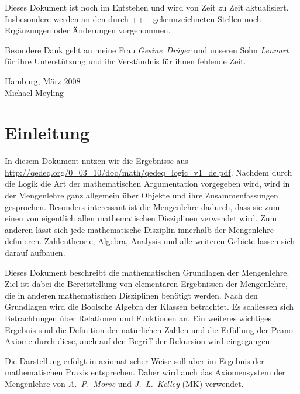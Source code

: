 \documentclass[a4paper,german,10pt,twoside]{book}
\theoremstyle{definition}
\theoremstyle{remark}
\begin{document}
\par
Dieses Dokument ist noch im Entstehen und wird von Zeit zu Zeit aktualisiert. Insbesondere werden an den durch {\glqq+++\grqq} gekennzeichneten Stellen noch Erg{\"a}nzungen oder {\"A}nderungen vorgenommen.

\par
Besondere Dank geht an meine Frau \emph{Gesine~Dr{\"a}ger} und unseren Sohn \emph{Lennart} f{\"u}r ihre Unterst{\"u}tzung und ihr Verst{\"a}ndnis f{\"u}r ihnen fehlende Zeit.

\par
\vspace*{1cm} Hamburg, M{\"a}rz 2008 \\
\hspace*{\fill} Michael Meyling


\chapter*{Einleitung\label{ch:introduction}} \label{chapter1} \hypertarget{chapter1}{}

In diesem Dokument nutzen wir die Ergebnisse aus \url{http://qedeq.org/0_03_10/doc/math/qedeq_logic_v1_de.pdf}.
Nachdem durch die Logik die Art der mathematischen Argumentation vorgegeben wird, wird in der Mengenlehre ganz allgemein {\"u}ber Objekte und ihre Zusammenfassungen gesprochen. Besonders interessant ist die Mengenlehre dadurch, dass sie zum einen von eigentlich allen mathematischen Disziplinen verwendet wird. Zum anderen l{\"a}sst sich jede mathematische Disziplin innerhalb der Mengenlehre definieren. Zahlentheorie, Algebra, Analysis und alle weiteren Gebiete lassen sich darauf aufbauen.
        
\par
Dieses Dokument beschreibt die mathematischen Grundlagen der Mengenlehre. Ziel ist dabei die Bereitstellung von elementaren Ergebnissen der Mengenlehre, die in anderen mathematischen Disziplinen ben{\"o}tigt werden. Nach den Grundlagen wird die Boolsche Algebra der Klassen betrachtet. Es schliessen sich Betrachtungen {\"u}ber Relationen und Funktionen an. Ein weiteres wichtiges Ergebnis sind die Definition der nat{\"u}rlichen Zahlen und die Erf{\"u}llung der Peano-Axiome durch diese, auch auf den Begriff der Rekursion wird eingegangen.
         
\par
Die Darstellung erfolgt in axiomatischer Weise soll aber im Ergebnis der mathematischen Praxis entsprechen. Daher wird auch das Axiomensystem der Mengenlehre von \emph{A.~P.~Morse} und  \emph{J.~L.~Kelley} (MK) verwendet.
\end{document}

